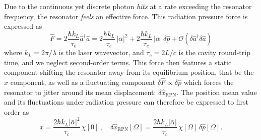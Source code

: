 Due to the continuous yet discrete photon \textit{hits} at a rate exceeding the resonator frequency, the resonator \textit{feels} an effective force. This radiation pressure force is expressed as 
\begin{equation}
  \hat F = 2 \frac{\hbar k_L}{\tau_c}\hat{a}^\dagger \hat{a} = 2 \frac{\hbar k_L}{\tau_c} \, |\bar{\alpha}|^2 +2 \frac{\hbar k_L}{\tau_c} \, |\bar \alpha| \, \delta \hat{p} + \mathcal{O}(\delta \hat{a}^\dagger \delta \hat{a})
\label{eq:Frad}
\end{equation}
where $k_L = 2\pi / \lambda$ is the laser wavevector, and $\tau_c=2L/c$ is the cavity round-trip time, and we neglect second-order terms. This force then features a static component shifting the resonator away from its equilibrium position, that be the $x$ component, as well as a fluctuating component $\delta \hat F\propto \delta \hat{p}$ which forces the resonator to jitter around its mean displacement: $\delta \hat x_{\mathrm{RPN}}$. The position mean value and its fluctuations under radiation pressure can therefore be expressed to first order as 
\begin{equation}
  x = \frac{2\hbar k_L |\bar \alpha|^2}{\tau_c}  \,  \chi[0] \, , \quad \delta \hat x_{\mathrm{RPN}} [\Omega]= \frac{2\hbar k_L |\bar \alpha|}{\tau_c}  \,  \chi[\Omega] \,  \delta \hat{p}[\Omega]. \label{eq:dx}
\end{equation} 



